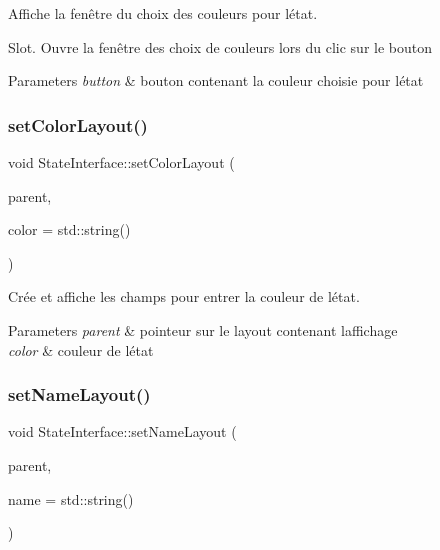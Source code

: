 Affiche la fenêtre du choix des couleurs pour l\textquotesingle{}état. 

Slot. Ouvre la fenêtre des choix de couleurs lors du clic sur le bouton 
\begin{DoxyParams}{Parameters}
{\em button} & bouton contenant la couleur choisie pour l\textquotesingle{}état \\
\hline
\end{DoxyParams}
\mbox{\label{class_state_interface_aaa101c2f5dc677034b0fdef57c45ce68}} 
\subsubsection{\texorpdfstring{set\+Color\+Layout()}{setColorLayout()}}
{\footnotesize\ttfamily void State\+Interface\+::set\+Color\+Layout (\begin{DoxyParamCaption}\item[{Q\+Box\+Layout $\ast$}]{parent,  }\item[{std\+::string}]{color = {\ttfamily std\+:\+:string()} }\end{DoxyParamCaption})\hspace{0.3cm}{\ttfamily [protected]}}



Crée et affiche les champs pour entrer la couleur de l\textquotesingle{}état. 


\begin{DoxyParams}{Parameters}
{\em parent} & pointeur sur le layout contenant l\textquotesingle{}affichage \\
\hline
{\em color} & couleur de l\textquotesingle{}état \\
\hline
\end{DoxyParams}
\mbox{\label{class_state_interface_ac719c2f6bf1897ac5c7e852e73b95aca}} 
\subsubsection{\texorpdfstring{set\+Name\+Layout()}{setNameLayout()}}
{\footnotesize\ttfamily void State\+Interface\+::set\+Name\+Layout (\begin{DoxyParamCaption}\item[{Q\+Box\+Layout $\ast$}]{parent,  }\item[{std\+::string}]{name = {\ttfamily std\+:\+:string()} }\end{DoxyParamCaption})\hspace{0.3cm}{\ttfamily [protected]}}



